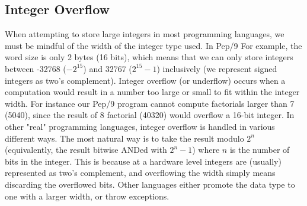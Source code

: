 \documentclass[12pt]{article}
\begin{document}
\subsection*{Integer Overflow}
When attempting to store large integers in most programming languages, we must be mindful of the width of the integer type used. In Pep/9 For example, the word size is only 2 bytes (16 bits), which means that we can only store integers between -32768 ($-2^{15}$) and 32767 ($2^{15}-1$) inclusively (we represent signed integers as two's complement). Integer overflow (or underflow) occurs when a computation would result in a number too large or small to fit within the integer width. For instance our Pep/9 program cannot compute factorials larger than 7 (5040), since the result of 8 factorial (40320) would overflow a 16-bit integer. In other "real" programming languages, integer overflow is handled in various different ways. The most natural way is to take the result modulo $2^{n}$ (equivalently, the result bitwise ANDed with $2^{n}-1$) where $n$ is the number of bits in the integer. This is because at a hardware level integers are (usually) represented as two's complement, and overflowing the width simply means discarding the overflowed bits. Other languages either promote the data type to one with a larger width, or throw exceptions.
\end{document}
